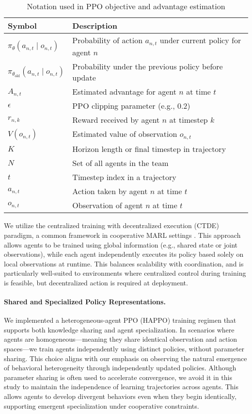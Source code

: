 \documentclass{article}
\begin{document}
\begin{table}[h]
    \centering
    \caption{Notation used in PPO objective and advantage estimation}
    \begin{tabular}{ll}
    \toprule
    \textbf{Symbol} & \textbf{Description} \\
    \midrule
    $\pi_\theta(a_{n,t} \mid o_{n,t})$ & Probability of action $a_{n,t}$ under current policy for agent $n$ \\
    $\pi_{\theta_{\text{old}}}(a_{n,t} \mid o_{n,t})$ & Probability under the previous policy before update \\
    $\hat{A}_{n,t}$ & Estimated advantage for agent $n$ at time $t$ \\
    $\epsilon$ & PPO clipping parameter (e.g., 0.2) \\
    $r_{n,k}$ & Reward received by agent $n$ at timestep $k$ \\
    $V(o_{n,t})$ & Estimated value of observation $o_{n,t}$ \\
    $K$ & Horizon length or final timestep in trajectory \\
    $N$ & Set of all agents in the team \\
    $t$ & Timestep index in a trajectory \\
    $a_{n,t}$ & Action taken by agent $n$ at time $t$ \\
    $o_{n,t}$ & Observation of agent $n$ at time $t$ \\
    \bottomrule
    \end{tabular}
\end{table}

We utilize the centralized training with decentralized execution (CTDE) paradigm, 
a common framework in cooperative MARL settings \cite{guo2024}. 
This approach allows agents to be trained using global information 
(e.g., shared state or joint observations), while each agent independently 
executes its policy based solely on local observations at runtime. 
This balances scalability with coordination, and is particularly well-suited 
to environments where centralized control during training is feasible, 
but decentralized action is required at deployment.

\paragraph{Shared and Specialized Policy Representations.} 
We implemented a heterogeneous-agent PPO (HAPPO) training regimen that supports both 
knowledge sharing and agent specialization. In scenarios where agents are 
homogeneous—meaning they share identical observation and action spaces—we train agents 
independently using distinct policies, without parameter sharing. 
This choice aligns with our emphasis on observing the natural emergence of 
behavioral heterogeneity through independently updated policies. 
Although parameter sharing is often used to accelerate convergence, 
we avoid it in this study to maintain the independence of learning trajectories across agents. 
This allows agents to develop divergent behaviors even when they begin identically, 
supporting emergent specialization under cooperative constraints.
\end{document}
